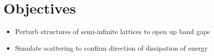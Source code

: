 \section{Objectives}
\begin{itemize}
\item Perturb structures of semi-infinite lattices to open up band gaps
\item Simulate scattering to confirm direction of dissipation of energy
\end{itemize}


